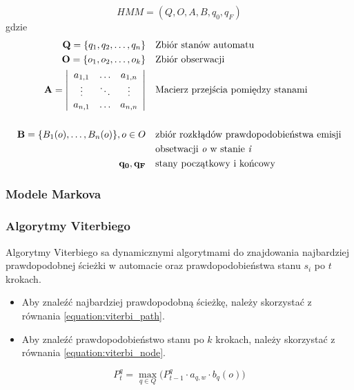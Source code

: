 \documentclass[11pt]{article}
\begin{document}
	    \begin{equation}
		    HMM = (Q, O, A, B, q_0, q_F)
		    \label{equation:HMM_def}
	    \end{equation}
	    gdzie
	    \begin{align*}
		    \mathbf{Q}=\{q_1, q_2,\ldots,q_n\} & &&  \text{Zbiór stanów automatu} \\
	 	    \mathbf{O}=\{o_1, o_2,\ldots,o_k\} & &&  \text{Zbiór obserwacji} \\
	 	    \mathbf{A} =
	 	    \left| \begin{array}{ccc}
		 	    a_{1,1} & \ldots & a_{1,n} \\
		 	    \vdots  & \ddots & \vdots\\
		 	    a_{n,1} & \ldots & a_{n,n}
	 	    \end{array} \right|
												 	    & &&  \text{Macierz przejścia pomiędzy stanami} \\
												 	    & && \\
	 	    \mathbf{B}=\{B_1(o),\ldots,B_n(o)\},o \in O & && \text{zbiór rozkłądów prawdopodobieństwa emisji} \\ 
													 	& && \text{obsetwacji \textit{o} w stanie \textit{i}} \\
		 	\mathbf{q_0, q_F}				  & && \text{stany początkowy i końcowy}
	    \end{align*}
	    
    	
	    	
	   \subsubsection{Modele Markova}
	   \subsubsection{Algorytmy Viterbiego}
		   Algorytmy Viterbiego sa dynamicznymi algorytmami do znajdowania najbardziej prawdopodobnej ścieżki w automacie oraz prawdopodobieństwa stanu $s_i$ po $t$ krokach. 
		   
		   \begin{itemize}
			   	\item Aby znaleźć najbardziej prawdopodobną ścieżkę, należy skorzystać z równania \ref{equation:viterbi_path}.
			   	\item Aby znaleźć prawdopodobieństwo stanu po $k$ krokach, należy skorzystać z równania \ref{equation:viterbi_node}.
		   \end{itemize}
	   
		   \begin{equation}
		   P_t^q=\max_{q \in Q} \bigg( P_{t-1}^q\cdot a_{q,w}\cdot b_q(o) \bigg)
		   \label{equation:viterbi_path}
		   \end{equation}
		   
\end{document}
